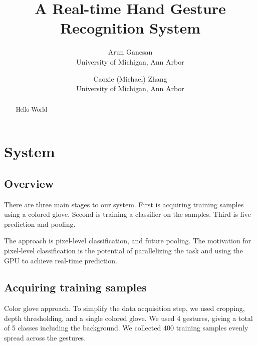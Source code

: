 \documentclass[letterpaper,twocolumn,10pt]{article}
\begin{document}
\date{}

\title{\Large \bf A Real-time Hand Gesture Recognition System}

\author{
{\rm Arun Ganesan}\\
University of Michigan, Ann Arbor
\and
{\rm Caoxie (Michael) Zhang}\\
University of Michigan, Ann Arbor
} %

\maketitle

\thispagestyle{empty}

\begin{abstract}
Hello World
\end{abstract}



\section{System}
\subsection{Overview}
There are three main stages to our system. First is acquiring training samples using a colored glove. Second is training a classifier on the samples. Third is live prediction and pooling. 

The approach is pixel-level classification, and future pooling. The motivation for pixel-level classification is the potential of parallelizing the task and using the GPU to achieve real-time prediction. 

\subsection{Acquiring training samples}
Color glove approach. To simplify the data acquisition step, we used cropping, depth thresholding, and a single colored glove. We used 4 gestures, giving a total of 5 classes including the background. We collected 400 training samples evenly spread across the gestures.  
\end{document}
